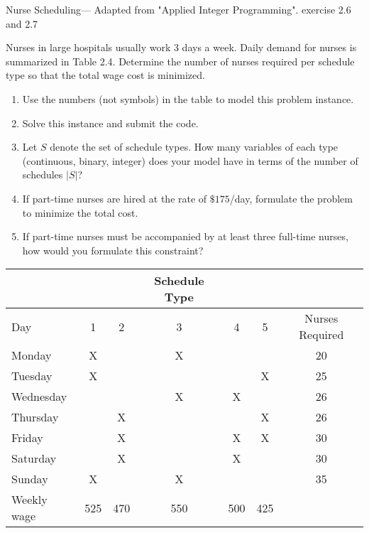 

\begin{example}{Nurse Scheduling}{--- Adapted from "Applied Integer Programming". exercise 2.6 and 2.7}
\end{example}
Nurses in large hospitals usually work 3 days a week. Daily demand for nurses is summarized in Table 2.4. Determine the number of nurses required per schedule type so that the total wage cost is minimized.
\begin{enumerate}
\item  Use the numbers (not symbols) in the table to model this problem instance.
\item Solve this instance and submit the code.
\item Let $S$ denote the set of schedule types.  How many variables of each type (continuous, binary, integer) does your model have in terms of the number of schedules $|S|$?
\item If part-time nurses are hired at the rate of $\$175$/day, formulate the problem to minimize the total cost. 
\item If part-time nurses must be accompanied by at least three full-time nurses, how would you formulate this constraint?
\end{enumerate}
\begin{table}[h]
\begin{center}
\begin{tabular}{l|ccccc|c}
\hline
\hline
& & & Schedule Type & & \\
\hline
Day & 1 & 2 & 3 & 4 & 5 & Nurses Required\\
\hline
Monday & X & & X & & & 20\\
Tuesday & X & &  &  & X & 25\\
Wednesday & & & X & X & & 26\\
Thursday& & X & & & X& 26\\
Friday & & X & & X & X & 30\\
Saturday& & X& & X& & 30\\
Sunday& X& & X & && 35\\
\hline
Weekly wage& 525 & 470 & 550 & 500 & 425\\
\hline 
\hline
\end{tabular}
\end{center}
\end{table}

